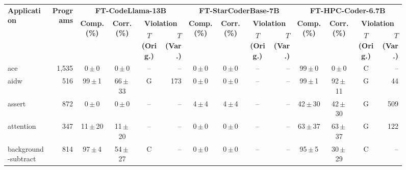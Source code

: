 \begin{figure}[!t]
\centering
\scriptsize
\setlength{\tabcolsep}{2.8pt}
\begin{tabular}{lr|c|c|cr|c|c|cr|c|c|cr}
\hline
\multirow{3}{*}{\textbf{Application}} & \multirow{3}{*}{\textbf{Programs}} & \multicolumn{4}{c|}{\textbf{FT-CodeLlama-13B}} & \multicolumn{4}{c|}{\textbf{FT-StarCoderBase-7B}} & \multicolumn{4}{c}{\textbf{FT-HPC-Coder-6.7B}} \\
\cline{3-14}
& & \multirow{2}{*}{\textbf{Comp. (\%)}} & \multirow{2}{*}{\textbf{Corr. (\%)}} & \multicolumn{2}{c|}{\textbf{Violation}} & \multirow{2}{*}{\textbf{Comp. (\%)}} & \multirow{2}{*}{\textbf{Corr. (\%)}} & \multicolumn{2}{c|}{\textbf{Violation}} & \multirow{2}{*}{\textbf{Comp. (\%)}} & \multirow{2}{*}{\textbf{Corr. (\%)}} & \multicolumn{2}{c}{\textbf{Violation}} \\
\cline{5-6}\cline{9-10}\cline{13-14}
& & & & \textbf{\boldmath$T$(Orig.)} & \textbf{\boldmath$T$(Var.)} & & & \textbf{\boldmath$T$(Orig.)} & \textbf{\boldmath$T$(Var.)} & & & \textbf{\boldmath$T$(Orig.)} & \textbf{\boldmath$T$(Var.)} \\
\hline
ace & 1{,}535 & \phantom{00}0\,$\pm$\,\phantom{0}0 & \phantom{00}0\,$\pm$\,\phantom{0}0 & -- & -- & \phantom{00}0\,$\pm$\,\phantom{0}0 & \phantom{00}0\,$\pm$\,\phantom{0}0 & -- & -- & \phantom{0}99\,$\pm$\,\phantom{0}0 & \phantom{00}0\,$\pm$\,\phantom{0}0 & \textsf{C} & -- \\
aidw & 516 & \phantom{0}99\,$\pm$\,\phantom{0}1 & \phantom{0}66\,$\pm$\,33 & \textsf{G} & 173 & \phantom{00}0\,$\pm$\,\phantom{0}0 & \phantom{00}0\,$\pm$\,\phantom{0}0 & -- & -- & \phantom{0}99\,$\pm$\,\phantom{0}1 & \phantom{0}92\,$\pm$\,11 & \textsf{G} & 44 \\
assert & 872 & \phantom{00}0\,$\pm$\,\phantom{0}0 & \phantom{00}0\,$\pm$\,\phantom{0}0 & -- & -- & \phantom{00}4\,$\pm$\,\phantom{0}4 & \phantom{00}4\,$\pm$\,\phantom{0}4 & -- & -- & \phantom{0}42\,$\pm$\,30 & \phantom{0}42\,$\pm$\,30 & \textsf{G} & 509 \\
attention & 347 & \phantom{0}11\,$\pm$\,20 & \phantom{0}11\,$\pm$\,20 & -- & -- & \phantom{00}0\,$\pm$\,\phantom{0}0 & \phantom{00}0\,$\pm$\,\phantom{0}0 & -- & -- & \phantom{0}63\,$\pm$\,37 & \phantom{0}63\,$\pm$\,37 & \textsf{G} & 122 \\
background-subtract & 814 & \phantom{0}97\,$\pm$\,\phantom{0}4 & \phantom{0}54\,$\pm$\,27 & \textsf{C} & -- & \phantom{00}0\,$\pm$\,\phantom{0}0 & \phantom{00}0\,$\pm$\,\phantom{0}0 & -- & -- & \phantom{0}95\,$\pm$\,\phantom{0}5 & \phantom{0}30\,$\pm$\,29 & \textsf{C} & -- \\

\end{tabular}
\end{figure}
